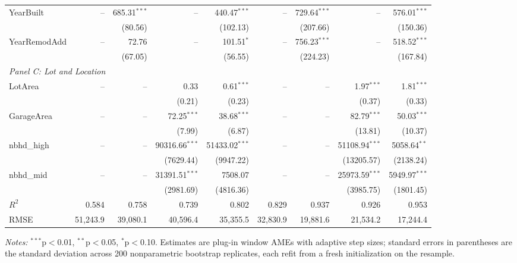 \begin{table}[htbp]
\begin{threeparttable}
\begin{tabular}{lrrrrrrrr}
\quad YearBuilt & -- & 685.31$^{***}$ & -- & 440.47$^{***}$ & -- & 729.64$^{***}$ & -- & 576.01$^{***}$ \\
 &  & (80.56) &  & (102.13) &  & (207.66) &  & (150.36) \\
\quad YearRemodAdd & -- & 72.76 & -- & 101.51$^{*}$ & -- & 756.23$^{***}$ & -- & 518.52$^{***}$ \\
 &  & (67.05) &  & (56.55) &  & (224.23) &  & (167.84) \\
\midrule
\multicolumn{9}{l}{\textit{Panel C: Lot and Location}} \\
\quad LotArea & -- & -- & 0.33 & 0.61$^{***}$ & -- & -- & 1.97$^{***}$ & 1.81$^{***}$ \\
 &  &  & (0.21) & (0.23) &  &  & (0.37) & (0.33) \\
\quad GarageArea & -- & -- & 72.25$^{***}$ & 38.68$^{***}$ & -- & -- & 82.79$^{***}$ & 50.03$^{***}$ \\
 &  &  & (7.99) & (6.87) &  &  & (13.81) & (10.37) \\
\quad nbhd\_high & -- & -- & 90316.66$^{***}$ & 51433.02$^{***}$ & -- & -- & 51108.94$^{***}$ & 5058.64$^{**}$ \\
 &  &  & (7629.44) & (9947.22) &  &  & (13205.57) & (2138.24) \\
\quad nbhd\_mid & -- & -- & 31391.51$^{***}$ & 7508.07 & -- & -- & 25973.59$^{***}$ & 5949.97$^{***}$ \\
 &  &  & (2981.69) & (4816.36) &  &  & (3985.75) & (1801.45) \\
\midrule
$R^2$ & 0.584 & 0.758 & 0.739 & 0.802 & 0.829 & 0.937 & 0.926 & 0.953 \\
RMSE & 51,243.9 & 39,080.1 & 40,596.4 & 35,355.5 & 32,830.9 & 19,881.6 & 21,534.2 & 17,244.4 \\
\bottomrule
\end{tabular}
\begin{tablenotes}
\footnotesize
\item \textit{Notes:} $^{***}$p$<$0.01, $^{**}$p$<$0.05, $^{*}$p$<$0.10. Estimates are plug-in window AMEs with adaptive step sizes; standard errors in parentheses are the standard deviation across 200 nonparametric bootstrap replicates, each refit from a fresh initialization on the resample.
\end{tablenotes}
\end{threeparttable}
\end{table}